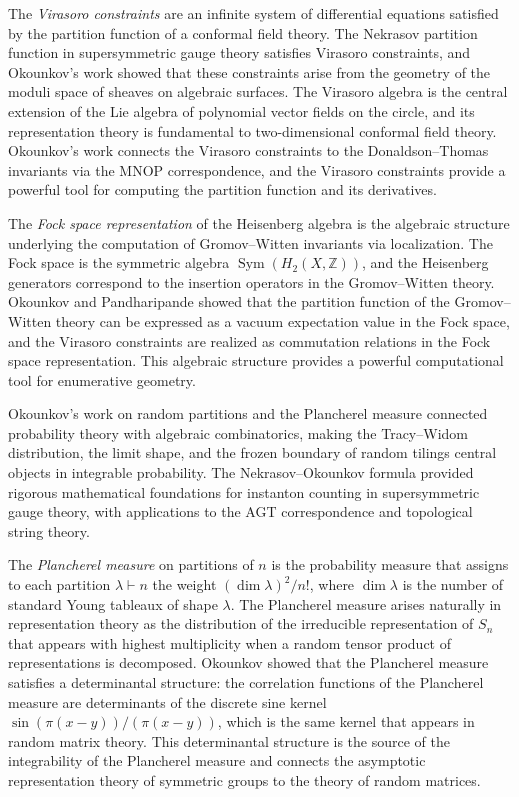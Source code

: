 The \emph{Virasoro constraints} are an infinite system of differential equations satisfied by the partition function of a conformal field theory. The Nekrasov partition function in supersymmetric gauge theory satisfies Virasoro constraints, and Okounkov's work showed that these constraints arise from the geometry of the moduli space of sheaves on algebraic surfaces. The Virasoro algebra is the central extension of the Lie algebra of polynomial vector fields on the circle, and its representation theory is fundamental to two-dimensional conformal field theory. Okounkov's work connects the Virasoro constraints to the Donaldson--Thomas invariants via the MNOP correspondence, and the Virasoro constraints provide a powerful tool for computing the partition function and its derivatives.

The \emph{Fock space representation} of the Heisenberg algebra is the algebraic structure underlying the computation of Gromov--Witten invariants via localization. The Fock space is the symmetric algebra $\operatorname{Sym}(H_2(X, \mathbb{Z}))$, and the Heisenberg generators correspond to the insertion operators in the Gromov--Witten theory. Okounkov and Pandharipande showed that the partition function of the Gromov--Witten theory can be expressed as a vacuum expectation value in the Fock space, and the Virasoro constraints are realized as commutation relations in the Fock space representation. This algebraic structure provides a powerful computational tool for enumerative geometry.

Okounkov's work on random partitions and the Plancherel measure connected probability theory with algebraic combinatorics, making the Tracy--Widom distribution, the limit shape, and the frozen boundary of random tilings central objects in integrable probability. The Nekrasov--Okounkov formula provided rigorous mathematical foundations for instanton counting in supersymmetric gauge theory, with applications to the AGT correspondence and topological string theory.

The \emph{Plancherel measure} on partitions of $n$ is the probability measure that assigns to each partition $\lambda \vdash n$ the weight $(\dim \lambda)^2 / n!$, where $\dim \lambda$ is the number of standard Young tableaux of shape $\lambda$. The Plancherel measure arises naturally in representation theory as the distribution of the irreducible representation of $S_n$ that appears with highest multiplicity when a random tensor product of representations is decomposed. Okounkov showed that the Plancherel measure satisfies a determinantal structure: the correlation functions of the Plancherel measure are determinants of the discrete sine kernel $\sin(\pi(x-y))/(\pi(x-y))$, which is the same kernel that appears in random matrix theory. This determinantal structure is the source of the integrability of the Plancherel measure and connects the asymptotic representation theory of symmetric groups to the theory of random matrices.

